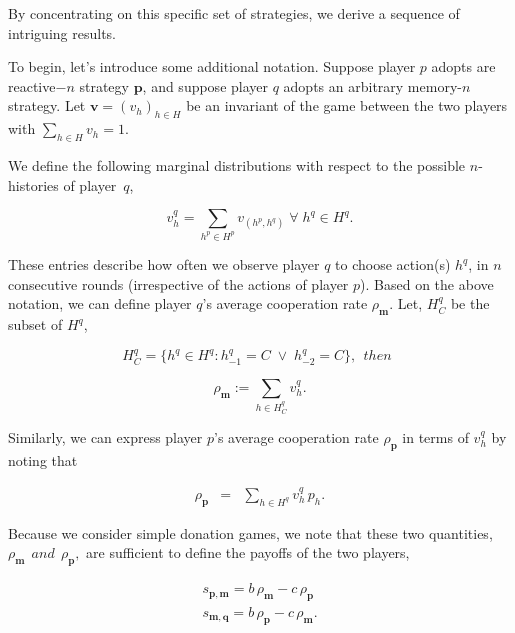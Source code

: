 \documentclass{article}
\theoremstyle{definition}
\begin{document}
By concentrating on this specific set of strategies, we derive a sequence of
intriguing results.

To begin, let's introduce some additional notation. Suppose player $p$ adopts
are reactive$-n$ strategy $\mathbf{p}$, and suppose player $q$ adopts an
arbitrary memory-$n$ strategy. Let $\mathbf{v}=(v_h)_{h\in H}$ be an invariant
of the game between the two players with $\displaystyle \sum_{h \in H} v_h = 1$.

We define the following marginal distributions with respect to the possible $n$-histories of player~$q$,

\begin{equation}\label{Eq:marginal_distributions}
\displaystyle v^q_{h} = \sum_{h^p\in H^p} v_{(h^p,h^q)} \; \forall \; h^q \in H^q.
\end{equation}

These entries describe how often we observe player $q$ to choose action(s)
$h^q$, in $n$ consecutive rounds (irrespective of the actions of player $p$).
Based on the above notation, we can define player $q$'s average cooperation rate
$\rho_\mathbf{m}$. Let, $H^{q}_{C}$ be the subset of $H^{q}$,

\begin{equation}
  H^{q}_{C} = \{h^q \in H^q : h^q_{-1} = C \; \lor \; h^q_{-2} = C\}, ~~then~~
\end{equation}

\begin{equation} \label{Eq:rhoq_alln}
  \rho_\mathbf{m} := \displaystyle \sum_{h \in H^{q}_{C}} v^q_{h}.
\end{equation}

Similarly, we can express player $p$'s average cooperation rate
$\rho_\mathbf{p}$ in terms of $v^q_{h}$ by
noting that

\begin{equation} \label{Eq:rhop_alln}
  \begin{array}{lll}
    \rho_\mathbf{p} &= &\displaystyle \sum_{h \in H^q} v^q_{h}\, p_{h}.
  \end{array}
\end{equation}

Because we consider simple donation games, we note that these two quantities,
$\rho_\mathbf{m}  ~~and~~ \rho_\mathbf{p},$ are
sufficient to define the payoffs of the two players,

\begin{equation} \label{Eq:payoff}
  \begin{array}{lll}
  s_{\mathbf{p}, \mathbf{m}}  =  b\, \rho_\mathbf{m} - c\, \rho_\mathbf{p}\\
  s_{\mathbf{m}, \mathbf{q}} = b\, \rho_\mathbf{p} - c\, \rho_\mathbf{m}.
  \end{array}
\end{equation}
\end{document}
